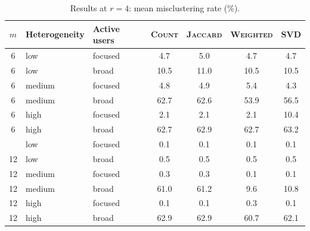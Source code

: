 \begin{table}[H]
\centering\small
\caption{Results at $r=4$: mean misclustering rate (\%).}
\label{tab:r4}
\begin{tabular}{@{}cllcccc@{}}
\toprule
$m$ & Heterogeneity & Active users & \textsc{Count} & \textsc{Jaccard} & \textsc{Weighted} & \textsc{SVD} \\
\midrule
6 & low & focused & 4.7 & 5.0 & 4.7 & 4.7 \\
6 & low & broad & 10.5 & 11.0 & 10.5 & 10.5 \\
6 & medium & focused & 4.8 & 4.9 & 5.4 & 4.3 \\
6 & medium & broad & 62.7 & 62.6 & 53.9 & 56.5 \\
6 & high & focused & 2.1 & 2.1 & 2.1 & 10.4 \\
6 & high & broad & 62.7 & 62.9 & 62.7 & 63.2 \\
\addlinespace
12 & low & focused & 0.1 & 0.1 & 0.1 & 0.1 \\
12 & low & broad & 0.5 & 0.5 & 0.5 & 0.5 \\
12 & medium & focused & 0.3 & 0.3 & 0.1 & 0.1 \\
12 & medium & broad & 61.0 & 61.2 & 9.6 & 10.8 \\
12 & high & focused & 0.1 & 0.1 & 0.3 & 0.1 \\
12 & high & broad & 62.9 & 62.9 & 60.7 & 62.1 \\
\bottomrule
\end{tabular}
\end{table}
